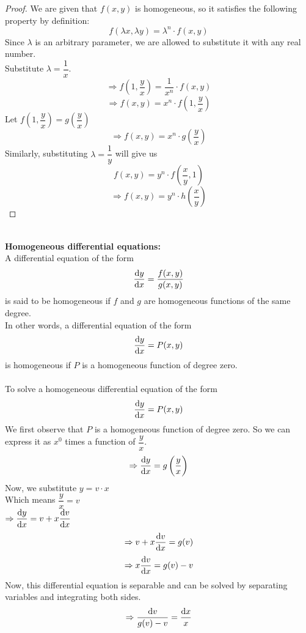 \documentclass[14]{article}
\theoremstyle{definition}
\theoremstyle{case}
\begin{document}
\begin{proof}
We are given that $f(x, y)$ is homogeneous, so it satisfies the following property by definition:
\[f(\lambda x, \lambda y) = \lambda^n \cdot f(x, y)\]
Since $\lambda$ is an arbitrary parameter, we are allowed to substitute it with any real number.\\
Substitute $\lambda = \dfrac1x$.
\[\Rightarrow f\left(1, \dfrac{y}{x}\right) = \dfrac1{x^n} \cdot f(x, y)\]
\[\Rightarrow f(x, y) = x^n \cdot f\left(1, \dfrac{y}{x}\right)\]
Let $f\left(1, \dfrac{y}{x}\right) = g\left(\dfrac{y}{x}\right)$
\[\Rightarrow f(x, y) = x^n \cdot g\left(\dfrac{y}{x}\right)\]
Similarly, substituting $\lambda = \dfrac1{y}$ will give us
\[f(x, y) = y^n \cdot f\left( \dfrac{x}{y}, 1 \right)\]
\[\Rightarrow f(x, y) = y^n \cdot h\left(\dfrac{x}{y}\right)\]
\end{proof}\text{}\\
\textbf{Homogeneous differential equations:}\\
A differential equation of the form \[\dfrac{\dif y}{\dif x} = \dfrac{f(x, y)}{g(x, y)}\] is said to be homogeneous if $f$ and $g$ are homogeneous functions of the same degree.\\
In other words, a differential equation of the form \[\dfrac{\dif y}{\dif x} = P(x, y)\]
is homogeneous if $P$ is a homogeneous function of degree zero.\\
\newpage
\text{}\\
To solve a homogeneous differential equation of the form 
\[\dfrac{\dif y}{\dif x} = P(x, y)\]
We first observe that $P$ is a homogeneous function of degree zero. So we can express it as $x^0$ times a function of $\dfrac{y}{x}$.
\[\Rightarrow \dfrac{\dif y}{\dif x} = g\left(\dfrac{y}{x}\right)\]
Now, we substitute $y = v \cdot x$\\
Which means $\dfrac{y}{x} = v$\\
$\Rightarrow \dfrac{\dif y}{\dif x} = v + x \dfrac{\dif v}{\dif x}$
\[\Rightarrow v + x \dfrac{\dif v}{\dif x} = g(v)\]
\[\Rightarrow x \dfrac{\dif v}{\dif x} = g(v) - v\]
Now, this differential equation is separable and can be solved by separating variables and integrating both sides.
\[\Rightarrow \dfrac{\dif v}{g(v) - v} = \dfrac{\dif x}{x}\]
\end{document}

